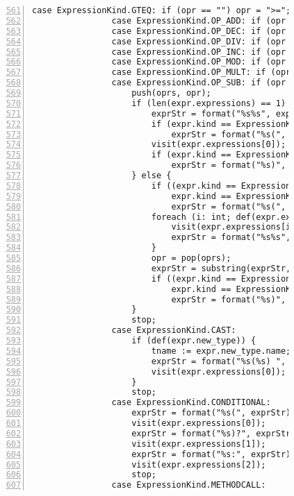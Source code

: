 \begin{figure}[ht!]
\begin{lstlisting}[numbers=left, tabsize=4, escapechar=@, caption={API Usage Mining Analysis},label={lst:aun-code},  firstline = 561, firstnumber = 561, lastline = 621]
                case ExpressionKind.GTEQ: if (opr == "") opr = ">=";
                case ExpressionKind.OP_ADD: if (opr == "") opr = "+";
                case ExpressionKind.OP_DEC: if (opr == "") opr = "--";
                case ExpressionKind.OP_DIV: if (opr == "") opr = "/"; 
                case ExpressionKind.OP_INC: if (opr == "") opr = "++"; 
                case ExpressionKind.OP_MOD: if (opr == "") opr = "%"; 
                case ExpressionKind.OP_MULT: if (opr == "") opr = "*";
                case ExpressionKind.OP_SUB: if (opr == "") opr = "-";
                    push(oprs, opr);
                    if (len(expr.expressions) == 1) {
                        exprStr = format("%s%s", exprStr, pop(oprs));
                        if (expr.kind == ExpressionKind.LOGICAL_NOT)
                            exprStr = format("%s(", exprStr);
                        visit(expr.expressions[0]);
                        if (expr.kind == ExpressionKind.LOGICAL_NOT)
                            exprStr = format("%s)", exprStr);
                    } else {
                        if ((expr.kind == ExpressionKind.ASSIGN && isPP) ||
                            expr.kind == ExpressionKind.LOGICAL_NOT) 
                            exprStr = format("%s(", exprStr);
                        foreach (i: int; def(expr.expressions[i])) {
                            visit(expr.expressions[i]);
                            exprStr = format("%s%s", exprStr, peek(oprs));
                        }
                        opr = pop(oprs);
                        exprStr = substring(exprStr, 0, (len(exprStr)-len(opr)));
                        if ((expr.kind == ExpressionKind.ASSIGN && isPP) ||
                            expr.kind == ExpressionKind.LOGICAL_NOT) 
                            exprStr = format("%s)", exprStr);
                    }
		            stop;
                case ExpressionKind.CAST:
                    if (def(expr.new_type)) {
                        tname := expr.new_type.name;
                        exprStr = format("%s(%s) ", exprStr, tname);
                        visit(expr.expressions[0]); 
                    }
                    stop;
                case ExpressionKind.CONDITIONAL:
                    exprStr = format("%s(", exprStr);
                    visit(expr.expressions[0]);
                    exprStr = format("%s)?", exprStr);
                    visit(expr.expressions[1]);
                    exprStr = format("%s:", exprStr);
                    visit(expr.expressions[2]);
                    stop;
                case ExpressionKind.METHODCALL:

\end{lstlisting}
\end{figure}
